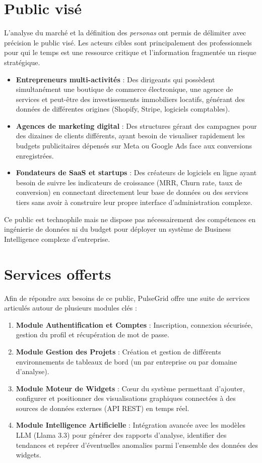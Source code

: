 ﻿\documentclass[12pt,a4paper,oneside]{report} %
\begin{document}
\section{Public visé}

L'analyse du marché et la définition des \textit{personas} ont permis de délimiter avec précision le public visé. Les acteurs cibles sont principalement des professionnels pour qui le temps est une ressource critique et l'information fragmentée un risque stratégique.

\begin{itemize}
    \item \textbf{Entrepreneurs multi-activités} : Des dirigeants qui possèdent simultanément une boutique de commerce électronique, une agence de services et peut-être des investissements immobiliers locatifs, générant des données de différentes origines (Shopify, Stripe, logiciels comptables).
    \item \textbf{Agences de marketing digital} : Des structures gérant des campagnes pour des dizaines de clients différents, ayant besoin de visualiser rapidement les budgets publicitaires dépensés sur Meta ou Google Ads face aux conversions enregistrées.
    \item \textbf{Fondateurs de SaaS et startups} : Des créateurs de logiciels en ligne ayant besoin de suivre les indicateurs de croissance (MRR, Churn rate, taux de conversion) en connectant directement leur base de données ou des services tiers sans avoir à construire leur propre interface d'administration complexe.
\end{itemize}

Ce public est technophile mais ne dispose pas nécessairement des compétences en ingénierie de données ni du budget pour déployer un système de Business Intelligence complexe d'entreprise.

\section{Services offerts}

Afin de répondre aux besoins de ce public, PulseGrid offre une suite de services articulés autour de plusieurs modules clés :

\begin{enumerate}
    \item \textbf{Module Authentification et Comptes} : Inscription, connexion sécurisée, gestion du profil et récupération de mot de passe.
    \item \textbf{Module Gestion des Projets} : Création et gestion de différents environnements de tableaux de bord (un par entreprise ou par domaine d'analyse).
    \item \textbf{Module Moteur de Widgets} : Cœur du système permettant d'ajouter, configurer et positionner des visualisations graphiques connectées à des sources de données externes (API REST) en temps réel.
    \item \textbf{Module Intelligence Artificielle} : Intégration avancée avec les modèles LLM (Llama 3.3) pour générer des rapports d'analyse, identifier des tendances et repérer d'éventuelles anomalies parmi l'ensemble des données des widgets.
\end{enumerate}
\end{document}
